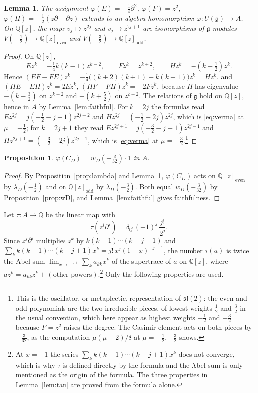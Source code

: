 \documentclass[11pt,a4paper,reqno]{amsart}
\newtheorem{proposition}[theorem]{Proposition}
\newtheorem{lemma}[theorem]{Lemma}
\theoremstyle{definition}
\newcommand{\Q}{\mathbb{Q}}
\newcommand{\g}{\mathfrak{g}}
\newcommand{\slt}{\mathfrak{sl}(2)}
\newcommand{\Ue}{U(\g)}
\newcommand{\dd}{\partial}
\begin{document}
\begin{lemma}\label{lem:osc}
The assignment $\varphi(E)=-\frac14\dd^2$, $\varphi(F)=z^2$, $\varphi(H)=-\frac12(z\dd+\dd z)$ extends to an algebra homomorphism $\varphi\colon\Ue\to A$. On $\Q[z]$, the maps $v_j\mapsto z^{2j}$ and $v_j\mapsto z^{2j+1}$ are isomorphisms of $\g$-modules $V(-\frac12)\to\Q[z]_{\mathrm{even}}$ and $V(-\frac32)\to\Q[z]_{\mathrm{odd}}$.
\end{lemma}

\begin{proof}
On $\Q[z]$,
\[
Ez^k=-\tfrac14k(k-1)z^{k-2},\qquad Fz^k=z^{k+2},\qquad Hz^k=-(k+\tfrac12)z^k .
\]
Hence $(EF-FE)z^k=-\frac14\bigl((k+2)(k+1)-k(k-1)\bigr)z^k=Hz^k$, and $(HE-EH)z^k=2Ez^k$, $(HF-FH)z^k=-2Fz^k$, because $H$ has eigenvalue $-(k-\frac32)$ on $z^{k-2}$ and $-(k+\frac52)$ on $z^{k+2}$. The relations of $\g$ hold on $\Q[z]$, hence in $A$ by Lemma~\ref{lem:faithful}. For $k=2j$ the formulas read $Ez^{2j}=j(-\frac12-j+1)z^{2j-2}$ and $Hz^{2j}=(-\frac12-2j)z^{2j}$, which is \eqref{eq:verma} at $\mu=-\frac12$; for $k=2j+1$ they read $Ez^{2j+1}=j(-\frac32-j+1)z^{2j-1}$ and $Hz^{2j+1}=(-\frac32-2j)z^{2j+1}$, which is \eqref{eq:verma} at $\mu=-\frac32$.\footnote{This is the oscillator, or metaplectic, representation of $\slt$: the even and odd polynomials are the two irreducible pieces, of lowest weights $\frac12$ and $\frac32$ in the usual convention, which here appear as highest weights $-\frac12$ and $-\frac32$ because $F=z^2$ raises the degree. The Casimir element acts on both pieces by $-\frac{3}{32}$, as the computation $\mu(\mu+2)/8$ at $\mu=-\frac12,-\frac32$ shows.}
\end{proof}

\begin{proposition}\label{prop:scalar}
$\varphi(C_D)=w_D(-\frac{3}{32})\cdot1$ in $A$.
\end{proposition}

\begin{proof}
By Proposition~\ref{prop:lambda} and Lemma~\ref{lem:osc}, $\varphi(C_D)$ acts on $\Q[z]_{\mathrm{even}}$ by $\lambda_D(-\frac12)$ and on $\Q[z]_{\mathrm{odd}}$ by $\lambda_D(-\frac32)$. Both equal $w_D(-\frac{3}{32})$ by Proposition~\ref{prop:wD}, and Lemma~\ref{lem:faithful} gives faithfulness.
\end{proof}

Let $\tau\colon A\to\Q$ be the linear map with
\[
\tau(z^i\dd^j)=\delta_{ij}\,(-1)^j\,\frac{j!}{2^j}.
\]
Since $z^j\dd^j$ multiplies $z^k$ by $k(k-1)\cdots(k-j+1)$ and $\sum_kk(k-1)\cdots(k-j+1)x^k=j!\,x^j(1-x)^{-j-1}$, the number $\tau(a)$ is twice the Abel sum $\lim_{x\to-1^+}\sum_k a_{kk}x^k$ of the supertrace of $a$ on $\Q[z]$, where $az^k=a_{kk}z^k+(\text{other powers})$.\footnote{At $x=-1$ the series $\sum_k k(k-1)\cdots(k-j+1)x^k$ does not converge, which is why $\tau$ is defined directly by the formula and the Abel sum is only mentioned as the origin of the formula. The three properties in Lemma~\ref{lem:tau} are proved from the formula alone.} Only the following properties are used.
\end{document}
